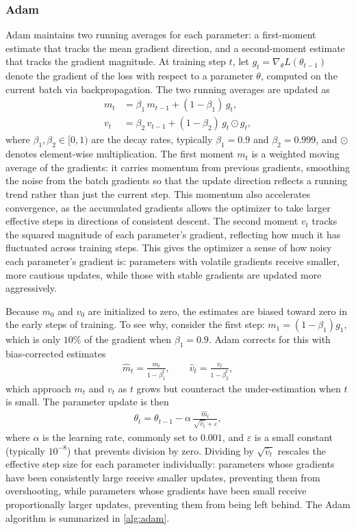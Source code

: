 \subsubsection{Adam}
Adam maintains two running averages for each parameter: a first-moment estimate that tracks the mean gradient direction, and a second-moment estimate that tracks the gradient magnitude. At training step $t$, let $g_t = \nabla_\theta L(\theta_{t-1})$ denote the gradient of the loss with respect to a parameter $\theta$, computed on the current batch via backpropagation. The two running averages are updated as
\begin{align*}
    m_t &= \beta_1\, m_{t-1} + (1 - \beta_1)\, g_t, \\
    v_t &= \beta_2\, v_{t-1} + (1 - \beta_2)\, g_t \odot g_t,
\end{align*}
where $\beta_1, \beta_2 \in [0, 1)$ are the decay rates, typically $\beta_1 = 0.9$ and $\beta_2 = 0.999$, and $\odot$ denotes element-wise multiplication. The first moment $m_t$ is a weighted moving average of the gradients: it carries momentum from previous gradients, smoothing the noise from the batch gradients so that the update direction reflects a running trend rather than just the current step. This momentum also accelerates convergence, as the accumulated gradients allows the optimizer to take larger effective steps in directions of consistent descent. The second moment $v_t$ tracks the squared magnitude of each parameter's gradient, reflecting how much it has fluctuated across training steps. This gives the optimizer a sense of how noisy each parameter's gradient is: parameters with volatile gradients receive smaller, more cautious updates, while those with stable gradients are updated more aggressively.

Because $m_0$ and $v_0$ are initialized to zero, the estimates are biased toward zero in the early steps of training. To see why, consider the first step: $m_1 = (1 - \beta_1) g_1$, which is only $10\%$ of the gradient when $\beta_1 = 0.9$. Adam corrects for this with bias-corrected estimates
\begin{align*}
    \hat{m}_t = \frac{m_t}{1 - \beta_1^t}, \qquad
    \hat{v}_t = \frac{v_t}{1 - \beta_2^t},
\end{align*}
which approach $m_t$ and $v_t$ as $t$ grows but counteract the under-estimation when $t$ is small. The parameter update is then
\begin{align*}
    \theta_t = \theta_{t-1} - \alpha\, \frac{\hat{m}_t}{\sqrt{\hat{v}_t} + \varepsilon},
\end{align*}
where $\alpha$ is the learning rate, commonly set to $0.001$, and $\varepsilon$ is a small constant (typically $10^{-8}$) that prevents division by zero. Dividing by $\sqrt{\hat{v}_t}$ rescales the effective step size for each parameter individually: parameters whose gradients have been consistently large receive smaller updates, preventing them from overshooting, while parameters whose gradients have been small receive proportionally larger updates, preventing them from being left behind. The Adam algorithm is summarized in \autoref{alg:adam}.

